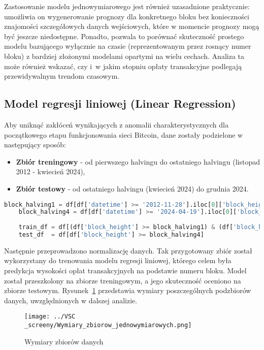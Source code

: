 \documentclass[12pt,a4paper]{report}
\theoremstyle{definition} %
\begin{document}
Zastosowanie modelu jednowymiarowego jest również uzasadnione praktycznie: umo\-żliwia on wygenerowanie prognozy dla konkretnego bloku bez konieczności znajomości szczegółowych danych wejściowych, które w momencie prognozy mogą być jeszcze niedostępne. Ponadto, pozwala to porównać skuteczność prostego modelu bazującego wyłącznie na czasie (reprezentowanym przez rosnący numer bloku) z bardziej złożonymi modelami opartymi na wielu cechach. Analiza ta może również wskazać, czy i~w jakim stopniu opłaty transakcyjne podlegają przewidywalnym trendom czasowym.

\subsection{Model regresji liniowej (Linear Regression)}

Aby uniknąć zakłóceń wynikających z anomalii charakterystycznych dla początkowego etapu funkcjonowania sieci Bitcoin, dane zostały podzielone w następujący sposób:
\begin{itemize}
    \item \textbf{Zbiór treningowy} - od pierwszego halvingu do ostatniego halvingu (listopad 2012 - kwiecień 2024),
    \item \textbf{Zbiór testowy} - od ostatniego halvingu (kwiecień 2024) do grudnia 2024.
\end{itemize}

\begin{lstlisting}[language=Python,caption=Podział danych na zbiory treningowy i testowy,label=ZbioryJ]
	block_halving1 = df[df['datetime'] >= '2012-11-28'].iloc[0]['block_height']
	block_halving4 = df[df['datetime'] >= '2024-04-19'].iloc[0]['block_height']
	
	train_df = df[(df['block_height'] >= block_halving1) & (df['block_height'] < block_halving4)]
	test_df  = df[df['block_height'] >= block_halving4]
\end{lstlisting}

Następnie przeprowadzono normalizację danych. Tak przygotowany zbiór został wykorzystany do trenowania modelu regresji liniowej, którego celem była predykcja wysokości opłat transakcyjnych na podstawie numeru bloku. Model został przeszkolony na zbiorze treningowym, a jego skuteczność oceniono na zbiorze testowym. Rysunek~\ref{fig:WZ} przedstawia wymiary poszczególnych podzbiorów danych, uwzględnionych w dalszej analizie.

	\begin{figure}[H]
	    \centering
	    \texttt{[image: ../VSC\\\_screeny/Wymiary\_zbiorow\_jednowymiarowych.png]} 
	    \caption{Wymiary zbiorów danych}
	    \label{fig:WZ}
	\end{figure}
\end{document}
